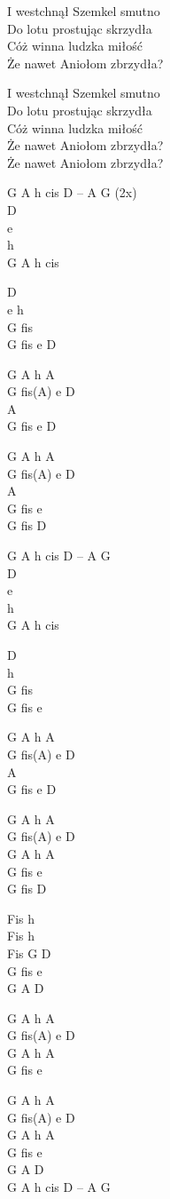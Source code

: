 \begin{text}
\vin I westchnął Szemkel smutno\\
\vin Do lotu prostując skrzydła\\
\vin Cóż winna ludzka miłość\\
\vin Że nawet Aniołom zbrzydła?

\vin I westchnął Szemkel smutno\\
\vin Do lotu prostując skrzydła\\
\vin Cóż winna ludzka miłość\\
\vin Że nawet Aniołom zbrzydła?\\
\vin Że nawet Aniołom zbrzydła?

\end{text}
\begin{chord}
G A h cis D – A G (2x)\\
D\\
e\\
h\\
G A h cis

D\\
e h\\
G fis\\
G fis e D

\vin G A h A\\
\vin G fis(A) e D\\
\vin A\\
\vin G fis e D

\vin G A h A\\
\vin G fis(A) e D\\
\vin A\\
\vin G fis e\\
\vin G fis D

\vin G A h cis D – A G\\
D\\
e\\
h\\
G A h cis

D\\
h\\
G fis\\
G fis e

\vin G A h A\\
\vin G fis(A) e D\\
\vin A\\
\vin G fis e D

\vin G A h A\\
\vin G fis(A) e D\\
\vin G A h A\\
\vin G fis e\\
\vin G fis D

Fis h\\
Fis h\\
Fis G D\\
G fis e\\
G A D

\vin G A h A\\
\vin G fis(A) e D\\
\vin G A h A\\
\vin G fis e

\vin G A h A\\
\vin G fis(A) e D\\
\vin G A h A\\
\vin G fis e\\
\vin G A D\\
G A h cis D – A G
\end{chord}
